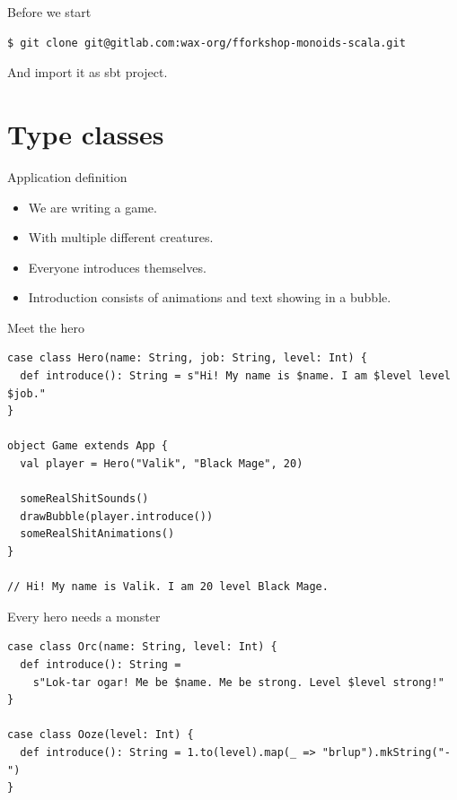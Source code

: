 \documentclass[presentation,aspectratio=169,smaller]{beamer}
\begin{document}
\begin{frame}[label={sec:orgc356369},fragile]{Before we start}
 \begin{verbatim}
$ git clone git@gitlab.com:wax-org/fforkshop-monoids-scala.git
\end{verbatim}

And import it as sbt project.
\end{frame}

\section{Type classes}
\label{sec:orgd4e4288}

\begin{frame}[label={sec:orgf8c3a6d}]{Application definition}
\begin{itemize}
\item We are writing a game.
\item With multiple different creatures.
\item Everyone introduces themselves.
\item Introduction consists of animations and text showing in a bubble.
\end{itemize}
\end{frame}

\begin{frame}[label={sec:org7215da5},fragile]{Meet the hero}
 \begin{verbatim}
case class Hero(name: String, job: String, level: Int) {
  def introduce(): String = s"Hi! My name is $name. I am $level level $job."
}

object Game extends App {
  val player = Hero("Valik", "Black Mage", 20)

  someRealShitSounds()
  drawBubble(player.introduce())
  someRealShitAnimations()
}

// Hi! My name is Valik. I am 20 level Black Mage.
\end{verbatim}
\end{frame}

\begin{frame}[label={sec:org059677e},fragile]{Every hero needs a monster}
 \begin{verbatim}
case class Orc(name: String, level: Int) {
  def introduce(): String =
    s"Lok-tar ogar! Me be $name. Me be strong. Level $level strong!"
}

case class Ooze(level: Int) {
  def introduce(): String = 1.to(level).map(_ => "brlup").mkString("-")
}
\end{verbatim}
\end{frame}
\end{document}
